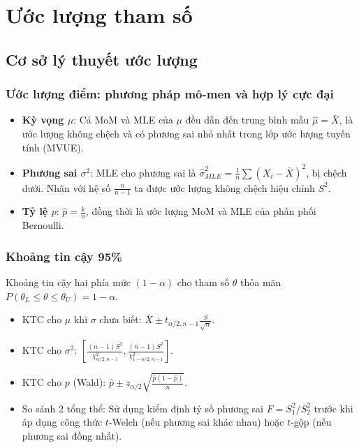\documentclass[12pt,a4paper]{report}
\begin{document}
\chapter{Ước lượng tham số}
\section{Cơ sở lý thuyết ước lượng}
\subsection{Ước lượng điểm: phương pháp mô-men và hợp lý cực đại}
\begin{itemize}
    \item \textbf{Kỳ vọng $\mu$}: Cả MoM và MLE của $\mu$ đều dẫn đến trung bình mẫu $\hat{\mu} = \bar{X}$, là ước lượng không chệch và có phương sai nhỏ nhất trong lớp ước lượng tuyến tính (MVUE).
    \item \textbf{Phương sai $\sigma^2$}: MLE cho phương sai là $\hat{\sigma}^2_{MLE} = \frac{1}{n}\sum (X_i - \bar{X})^2$, bị chệch dưới. Nhân với hệ số $\frac{n}{n-1}$ ta được ước lượng không chệch hiệu chỉnh $S^2$.
    \item \textbf{Tỷ lệ $p$}: $\hat{p} = \frac{k}{n}$, đồng thời là ước lượng MoM và MLE của phân phối Bernoulli.
\end{itemize}

\subsection{Khoảng tin cậy 95\%}
Khoảng tin cậy hai phía mức $(1-\alpha)$ cho tham số $\theta$ thỏa mãn $P(\theta_L \le \theta \le \theta_U) = 1 - \alpha$.
\begin{itemize}
    \item KTC cho $\mu$ khi $\sigma$ chưa biết: $\bar{X} \pm t_{\alpha/2, n-1} \frac{S}{\sqrt{n}}$.
    \item KTC cho $\sigma^2$: $\left[\frac{(n-1)S^2}{\chi^2_{\alpha/2, n-1}}, \frac{(n-1)S^2}{\chi^2_{1-\alpha/2, n-1}}\right]$.
    \item KTC cho $p$ (Wald): $\hat{p} \pm z_{\alpha/2} \sqrt{\frac{\hat{p}(1-\hat{p})}{n}}$.
    \item So sánh 2 tổng thể: Sử dụng kiểm định tỷ số phương sai $F = S_1^2 / S_2^2$ trước khi áp dụng công thức $t$-Welch (nếu phương sai khác nhau) hoặc $t$-gộp (nếu phương sai đồng nhất).
\end{itemize}
\end{document}
